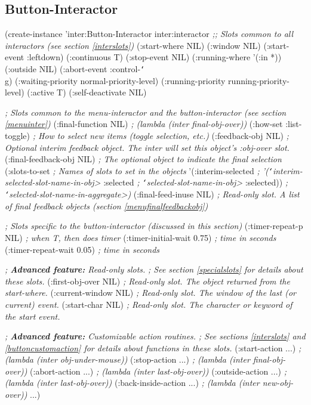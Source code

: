 \begin{group}
\section{Button-Interactor}
\label{buttoninter}

\begin{programexample}
(create-instance 'inter:Button-Interactor inter:interactor
  {\it ;; Slots common to all interactors (see section \ref{interslots})}
  (:start-where NIL)
  (:window NIL)
  (:start-event :leftdown)
  (:continuous T)
  (:stop-event NIL)
  (:running-where '(:in *))
  (:outside NIL)
  (:abort-event :control-{\tt\char`\\}g)
  (:waiting-priority normal-priority-level)
  (:running-priority running-priority-level)
  (:active T)
  (:self-deactivate NIL)

  {\it ; Slots common to the menu-interactor and the button-interactor (see section \ref{menuinter})}
  (:final-function NIL)      {\it ; (lambda (inter final-obj-over))}
  (:how-set :list-toggle)    {\it ; How to select new items (toggle selection, etc.)}
  (:feedback-obj NIL)        {\it ; Optional interim feedback object.  The inter will set this object's :obj-over slot.}
  (:final-feedback-obj NIL)  {\it ; The optional object to indicate the final selection}
  (:slots-to-set             {\it ; Names of slots to set in the objects}
   '(:interim-selected       {\it ;   '({\tt\char`\<}interim-selected-slot-name-in-obj>}
     :selected               {\it ;     {\tt\char`\<}selected-slot-name-in-obj>}
     :selected))             {\it ;     {\tt\char`\<}selected-slot-name-in-aggregate>)}
  (:final-feed-inuse NIL)    {\it ; Read-only slot.  A list of final feedback objects (section \ref{menufinalfeedbackobj})}

  {\it ; Slots specific to the button-interactor (discussed in this section)}
  (:timer-repeat-p NIL)        {\it ; when T, then does timer}
  (:timer-initial-wait 0.75)   {\it ; time in seconds}
  (:timer-repeat-wait 0.05)    {\it ; time in seconds}

  {\it ; {\bf Advanced feature:}  Read-only slots.}
  {\it ; See section \ref{specialslots} for details about these slots.}
  (:first-obj-over NIL)     {\it ; Read-only slot.  The object returned from the start-where.}
  (:current-window NIL)     {\it ; Read-only slot.  The window of the last (or current) event.}
  (:start-char NIL)         {\it ; Read-only slot.  The character or keyword of the start event.}

  {\it ; {\bf Advanced feature:} Customizable action routines.}
  {\it ; See sections \ref{interslots} and \ref{buttoncustomaction} for details about functions in these slots.}
  (:start-action ...)       {\it ; (lambda (inter obj-under-mouse))}
  (:stop-action ...)        {\it ; (lambda (inter final-obj-over))}
  (:abort-action ...)       {\it ; (lambda (inter last-obj-over))}
  (:outside-action ...)     {\it ; (lambda (inter last-obj-over))}
  (:back-inside-action ...) {\it ; (lambda (inter new-obj-over))}
...)
\end{programexample}
\end{group}

